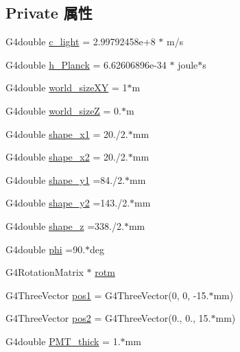 \subsection*{Private 属性}
\begin{DoxyCompactItemize}
\item 
G4double \hyperlink{classmuonDetectorConstruction_ae84a9c5b8ae8c23a525d2fac1c8574b4}{c\+\_\+light} = 2.\+99792458e+8 $\ast$ m/s
\item 
G4double \hyperlink{classmuonDetectorConstruction_a77f36e64a1d560b7121aa14bf07c9ffe}{h\+\_\+\+Planck} = 6.\+62606896e-\/34 $\ast$ joule$\ast$s
\item 
G4double \hyperlink{classmuonDetectorConstruction_a658d653c8308534496baa24f7aaf938b}{world\+\_\+size\+XY} = 1$\ast$m
\item 
G4double \hyperlink{classmuonDetectorConstruction_a0260171e245912eeff14a2bdb7cca44c}{world\+\_\+sizeZ} = 0.$\ast$m
\item 
G4double \hyperlink{classmuonDetectorConstruction_a7577159570a4ff317f76f47375cababe}{shape\+\_\+x1} = 20./2.$\ast$mm
\item 
G4double \hyperlink{classmuonDetectorConstruction_afc85d07aa046b01cb159bcaaa3ad6c4c}{shape\+\_\+x2} = 20./2.$\ast$mm
\item 
G4double \hyperlink{classmuonDetectorConstruction_ac20e987f6a591bc5a95364b0d6540a99}{shape\+\_\+y1} =84./2.$\ast$mm
\item 
G4double \hyperlink{classmuonDetectorConstruction_a83c1a7279ddb926ff746cdad0d139a1c}{shape\+\_\+y2} =143./2.$\ast$mm
\item 
G4double \hyperlink{classmuonDetectorConstruction_a51a6e95e1310965fb98c6fc1ed089014}{shape\+\_\+z} =338./2.$\ast$mm
\item 
G4double \hyperlink{classmuonDetectorConstruction_ae2913b2b14fcbf88711169912921c19d}{phi} =90.$\ast$deg
\item 
G4\+Rotation\+Matrix $\ast$ \hyperlink{classmuonDetectorConstruction_add745b205f093512b89e9263ac2c25bc}{rotm}
\item 
G4\+Three\+Vector \hyperlink{classmuonDetectorConstruction_a42199de1e9de3faacba57df6daff6a4c}{pos1} = G4\+Three\+Vector(0, 0, -\/15.$\ast$mm)
\item 
G4\+Three\+Vector \hyperlink{classmuonDetectorConstruction_a721185f703649b2297ff57c3459969d1}{pos2} = G4\+Three\+Vector(0., 0., 15.$\ast$mm)
\item 
G4double \hyperlink{classmuonDetectorConstruction_a7f0c69005e9e3700f89ea5ec340f784b}{P\+M\+T\+\_\+thick} = 1.$\ast$mm

\end{DoxyCompactItemize}
